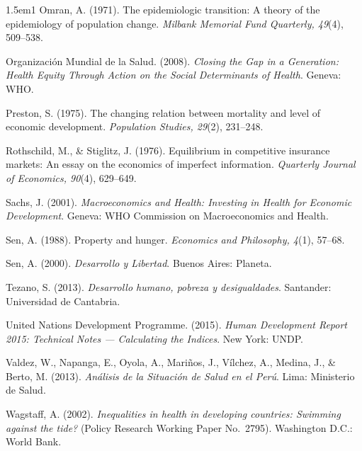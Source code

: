 \documentclass[12pt]{article}
\begin{document}
\begin{hangparas}{1.5em}{1}
Omran, A. (1971). The epidemiologic transition: A theory of the epidemiology of population
change. \textit{Milbank Memorial Fund Quarterly, 49}(4), 509--538.

Organización Mundial de la Salud. (2008). \textit{Closing the Gap in a Generation: Health
Equity Through Action on the Social Determinants of Health}. Geneva: WHO.

Preston, S. (1975). The changing relation between mortality and level of economic development.
\textit{Population Studies, 29}(2), 231--248.

Rothschild, M., \& Stiglitz, J. (1976). Equilibrium in competitive insurance markets: An essay
on the economics of imperfect information. \textit{Quarterly Journal of Economics, 90}(4),
629--649.

Sachs, J. (2001). \textit{Macroeconomics and Health: Investing in Health for Economic
Development}. Geneva: WHO Commission on Macroeconomics and Health.

Sen, A. (1988). Property and hunger. \textit{Economics and Philosophy, 4}(1), 57--68.

Sen, A. (2000). \textit{Desarrollo y Libertad}. Buenos Aires: Planeta.

Tezano, S. (2013). \textit{Desarrollo humano, pobreza y desigualdades}. Santander: Universidad
de Cantabria.

United Nations Development Programme. (2015). \textit{Human Development Report 2015:
Technical Notes --- Calculating the Indices}. New York: UNDP.

Valdez, W., Napanga, E., Oyola, A., Mariños, J., Vílchez, A., Medina, J., \& Berto, M. (2013).
\textit{Análisis de la Situación de Salud en el Perú}. Lima: Ministerio de Salud.

Wagstaff, A. (2002). \textit{Inequalities in health in developing countries: Swimming against
the tide?} (Policy Research Working Paper No.~2795). Washington D.C.: World Bank.

\end{hangparas}
\end{document}
